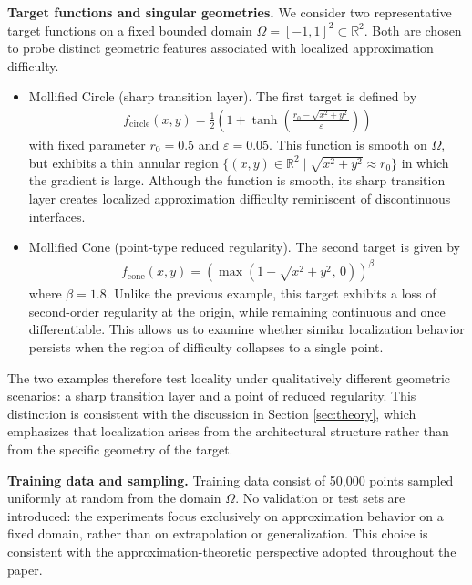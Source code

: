 \documentclass[11pt,reqno]{amsart}
\numberwithin{equation}{section}
\theoremstyle{remark}
\theoremstyle{definition}
\newcommand{\emphTitle}[1]{\medskip\noindent\textbf{#1.}\quad}
\begin{document}
\emphTitle{Target functions and singular geometries}
We consider two representative target functions on a fixed bounded domain $\Omega = [-1,1]^{2} \subset \mathbb{R}^2$. Both are chosen to probe distinct geometric features associated with localized approximation difficulty.
\begin{itemize} 
    \item 
    Mollified Circle (sharp transition layer). 
    The first target is defined by
        \begin{align}
        f_{\mathrm{circle}}(x,y)
        = \frac{1}{2}
        \left(
        1 + \tanh\!\left(\frac{r_0 - \sqrt{x^2 + y^2}}{\varepsilon}\right)
        \right)
        \end{align}
    with fixed parameter $r_0 = 0.5$ and $\varepsilon = 0.05$. This function is smooth on $\Omega$, but exhibits a thin annular region 
    $\{ (x,y) \in \mathbb{R}^2 \mid \sqrt{x^2 + y^2} \approx r_0 \}$
    in which the gradient is large. Although the function is smooth, its sharp transition layer creates localized approximation difficulty reminiscent of discontinuous interfaces.
    \item 
    Mollified Cone (point-type reduced regularity).
    The second target is given by
        \begin{align}
        f_{\mathrm{cone}}(x,y)
        = \left(
        \max\!\left(1 - \sqrt{x^2 + y^2},\, 0\right)
        \right)^{\beta}
        \end{align}
    where $\beta = 1.8$. 
    Unlike the previous example, this target exhibits a loss of second-order regularity at the origin, while remaining continuous and once differentiable. This allows us to examine whether similar localization behavior persists when the region of difficulty collapses to a single point.
\end{itemize}   
The two examples therefore test locality under qualitatively different geometric scenarios: a sharp transition layer and a point of reduced regularity.
This distinction is consistent with the discussion in Section \ref{sec:theory}, which emphasizes that localization arises from the architectural structure rather than from the specific geometry of the target.


\emphTitle{Training data and sampling}
Training data consist of 50,000 points sampled uniformly at random from the domain $\Omega$. No validation or test sets are introduced: the experiments focus exclusively on approximation behavior on a fixed domain, rather than on extrapolation or generalization. This choice is consistent with the approximation-theoretic perspective adopted throughout the paper.
\end{document}
